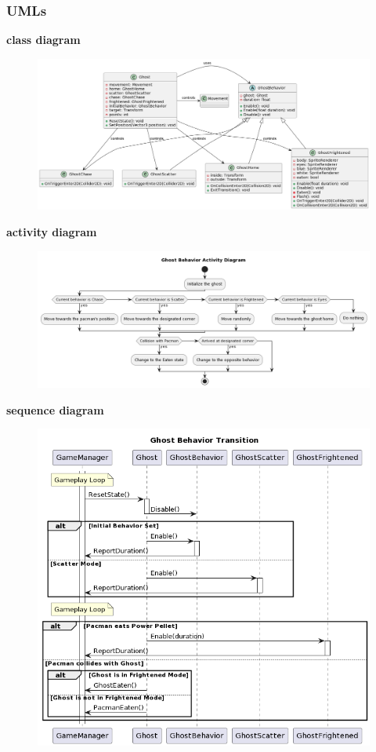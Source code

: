 \documentclass[11pt]{article}
\begin{document}
\subsubsection{UMLs}
\textbf{class diagram}\\
\begin{figure}[H]
    \centering
    \includegraphics*[scale=0.25]{Ghost_Class.png}
\end{figure}
\textbf{activity diagram}\\
\begin{figure}[H]
    \centering
    \includegraphics*[scale=0.3]{Ghost_Activity.png}
\end{figure}
\textbf{sequence diagram}\\
\begin{figure}[H]
    \centering
    \includegraphics*[scale=0.4]{Ghost_Sequence.png}
\end{figure}
\end{document}

